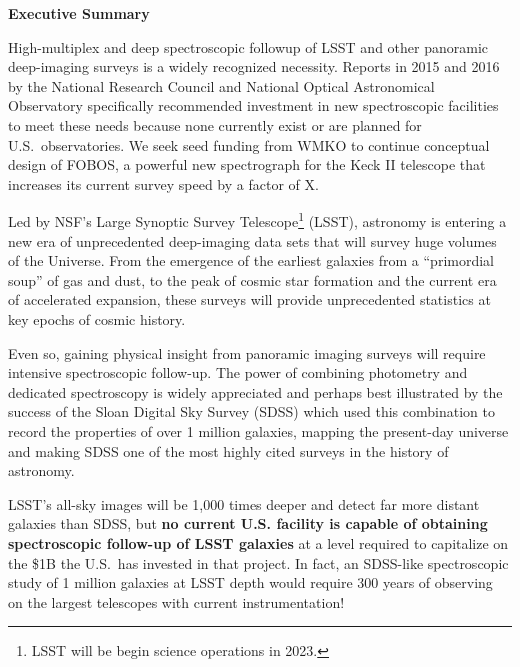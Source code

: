 
\centerline{{\large\bf Executive Summary}}


High-multiplex and deep spectroscopic followup of LSST and other
panoramic deep-imaging surveys is a widely recognized necessity.
Reports in 2015 and 2016 by the National Research Council and
National Optical Astronomical Observatory specifically recommended
investment in new spectroscopic facilities to meet these needs
because none currently exist or are planned for U.S.\ observatories.
We seek seed funding from WMKO to continue conceptual design of
FOBOS, a powerful new spectrograph for the Keck II telescope that increases its current survey speed by a factor of X.

Led by NSF's Large Synoptic Survey Telescope\footnote{
%
LSST will be begin science operations in 2023.}
%
(LSST), astronomy is entering a new era of unprecedented deep-imaging data sets that will survey huge volumes of the
Universe.  From the emergence of the earliest galaxies from a ``primordial soup'' of gas and dust, to the peak of
cosmic star formation and the current era of accelerated expansion, these surveys will provide unprecedented statistics
at key epochs of cosmic history.


Even so, gaining physical insight from panoramic imaging surveys will require intensive spectroscopic follow-up.  The
power of combining photometry and dedicated spectroscopy is widely appreciated and perhaps best illustrated by the
success of the Sloan Digital Sky Survey (SDSS) which used this combination to record the properties of over 1 million
galaxies, mapping the present-day universe and making SDSS one of the most highly cited surveys in the history of
astronomy.

LSST's all-sky images will be 1,000 times deeper and detect far more
distant galaxies than SDSS, but \textbf{no current U.S. facility is
capable of obtaining spectroscopic follow-up of LSST galaxies} at a level
required to capitalize on the \$1B the U.S.\ has invested in that
project.  In fact, an SDSS-like spectroscopic study of 1 million
galaxies at LSST depth would require 300 years of observing on the
largest telescopes with current instrumentation!  

